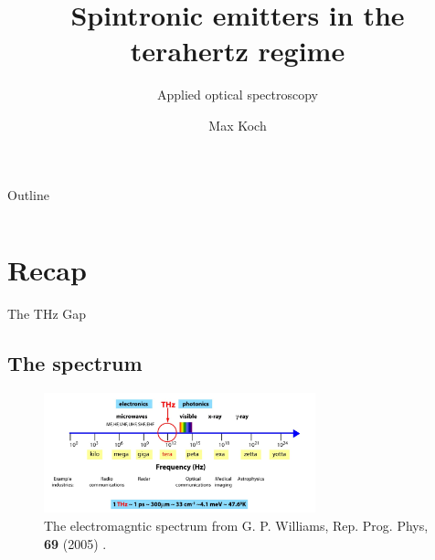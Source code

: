 \documentclass[aspectratio=1610, 9pt]{beamer}
\title{Spintronic emitters in the terahertz regime}
\subtitle{Applied optical spectroscopy}
\author[M.~Koch]{Max Koch}
\institute[]{TU Dortmund \\  Fakultät Physik}
\begin{document}
\maketitle

\begin{frame}{Outline}
  \begin{columns}
    \begin{column}{.2\textwidth}
    \end{column}
    \begin{column}{.8\textwidth}
      \tableofcontents
    \end{column}
  \end{columns}
\end{frame}


\section{Recap}

\begin{frame}{The THz Gap}
  \subsection{The spectrum}
  \begin{center}
    \begin{figure}
      \includegraphics[width=0.7\textwidth]{images/spectrum.png}
      \caption{\textcolor{tugreen}{The electromagntic spectrum} from G. P. Williams, Rep. Prog. Phys, \textbf{69} (2005) .}
      \nocite{spectrum_pic}
    \end{figure}
  \end{center}
\end{frame}
\end{document}
